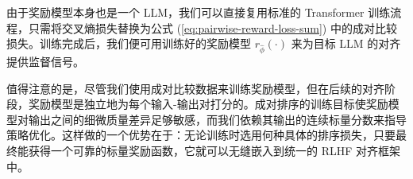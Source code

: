 由于奖励模型本身也是一个 LLM，我们可以直接复用标准的 Transformer 训练流程，只需将交叉熵损失替换为公式 (\ref{eq:pairwise-reward-loss-sum}) 中的成对比较损失。训练完成后，我们便可用训练好的奖励模型 $r_{\hat{\phi}}(\cdot)$ 来为目标 LLM 的对齐提供监督信号。

值得注意的是，尽管我们使用成对比较数据来训练奖励模型，但在后续的对齐阶段，奖励模型是独立地为每个输入-输出对打分的。成对排序的训练目标使奖励模型对输出之间的细微质量差异足够敏感，而我们依赖其输出的连续标量分数来指导策略优化。这样做的一个优势在于：无论训练时选用何种具体的排序损失，只要最终能获得一个可靠的标量奖励函数，它就可以无缝嵌入到统一的 RLHF 对齐框架中。